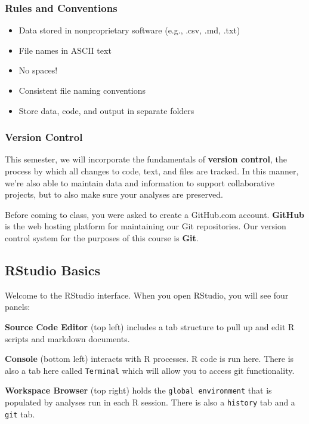 \documentclass[
]{article}
\providecommand{\tightlist}{%
  \setlength{\itemsep}{0pt}\setlength{\parskip}{0pt}}
\begin{document}
\hypertarget{rules-and-conventions}{%
\subsubsection{Rules and Conventions}\label{rules-and-conventions}}

\begin{itemize}
\tightlist
\item
  Data stored in nonproprietary software (e.g., .csv, .md, .txt)
\item
  File names in ASCII text
\item
  No spaces!
\item
  Consistent file naming conventions
\item
  Store data, code, and output in separate folders
\end{itemize}

\hypertarget{version-control}{%
\subsubsection{Version Control}\label{version-control}}

This semester, we will incorporate the fundamentals of \textbf{version
control}, the process by which all changes to code, text, and files are
tracked. In this manner, we're also able to maintain data and
information to support collaborative projects, but to also make sure
your analyses are preserved.

Before coming to class, you were asked to create a GitHub.com account.
\textbf{GitHub} is the web hosting platform for maintaining our Git
repositories. Our version control system for the purposes of this course
is \textbf{Git}.

\hypertarget{rstudio-basics}{%
\subsection{RStudio Basics}\label{rstudio-basics}}

Welcome to the RStudio interface. When you open RStudio, you will see
four panels:

\textbf{Source Code Editor} (top left) includes a tab structure to pull
up and edit R scripts and markdown documents.

\textbf{Console} (bottom left) interacts with R processes. R code is run
here. There is also a tab here called \texttt{Terminal} which will allow
you to access git functionality.

\textbf{Workspace Browser} (top right) holds the
\texttt{global\ environment} that is populated by analyses run in each R
session. There is also a \texttt{history} tab and a \texttt{git} tab.
\end{document}
